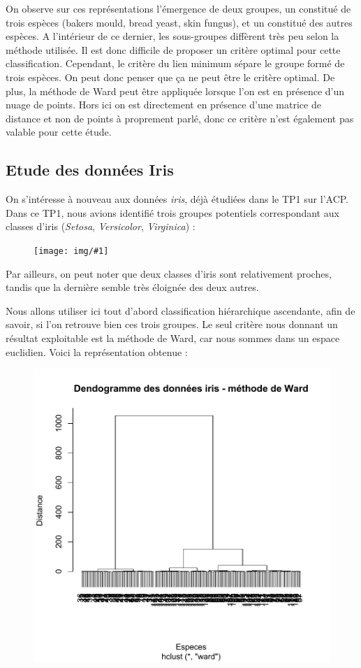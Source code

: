 \documentclass[a4paper,11pt]{article}
\newcommand{\InsertFig}[1]{
\begin{figure}[H]
\begin{center}
\texttt{[image: img/\#1]}
\end{center}
\end{figure}}
\begin{document}
\noindent On observe sur ces représentations l'émergence de deux groupes, un constitué de trois espèces (bakers mould, bread yeast, skin fungus), et un constitué des autres espèces. A l'intérieur de ce dernier, les sous-groupes diffèrent très peu selon la méthode utilisée. Il est donc difficile de proposer un critère optimal pour cette classification. Cependant, le critère du lien minimum sépare le groupe formé de trois espèces. On peut donc penser que ça ne peut être le critère optimal. De plus, la méthode de Ward peut être appliquée lorsque l'on est en présence d'un nuage de points. Hors ici on est directement en présence d'une matrice de distance et non de points à proprement parlé, donc ce critère n'est également pas valable pour cette étude.

\subsection{Etude des données Iris}

\noindent On s'intéresse à nouveau aux données \textit{iris}, déjà étudiées dans le TP1 sur l'ACP. Dans ce TP1, nous avions identifié trois groupes potentiels correspondant aux classes d'iris (\textit{Setosa}, \textit{Versicolor}, \textit{Virginica}) : 

\InsertFig{acpiris}

\noindent Par ailleurs, on peut noter que deux classes d'iris sont relativement proches, tandis que la dernière semble très éloignée des deux autres. 

\noindent Nous allons utiliser ici tout d'abord classification hiérarchique ascendante, afin de savoir, si l'on retrouve bien ces trois groupes. Le seul critère nous donnant un résultat exploitable est la méthode de Ward, car nous sommes dans un espace euclidien. Voici la représentation obtenue : 

\begin{figure}[H]
\begin{center}
\includegraphics[width=.55\textwidth]{img/dendoiris.pdf}
\end{center}
\end{figure}
\end{document}
